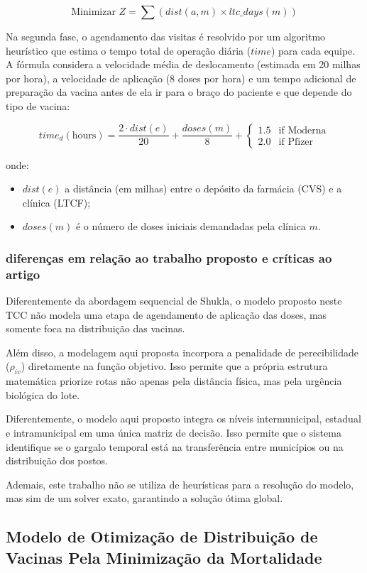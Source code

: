 \[
\text{Minimizar } Z = \sum (dist(a,m) \times ltc\_days(m))
\]

Na segunda fase, o agendamento das visitas é resolvido por um algoritmo heurístico que estima o tempo total de operação diária ($time$) para cada equipe. A fórmula considera a velocidade média de deslocamento (estimada em 20 milhas por hora), a velocidade de aplicação (8 doses por hora) e um tempo adicional de preparação da vacina antes de ela ir para o braço do paciente e que depende do tipo de vacina:

\[
time_{d}(\text{hours}) = \frac{2 \cdot dist(e)}{20} + \frac{doses(m)}{8} + 
\begin{cases} 
    1.5 & \text{if Moderna} \\
    2.0 & \text{if Pfizer} 
\end{cases}
\]

onde:
\begin{itemize}
    \item $dist(e)$ a distância (em milhas) entre o depósito da farmácia (CVS) e a clínica (LTCF);
    \item $doses(m)$ é o número de doses iniciais demandadas pela clínica $m$.
\end{itemize}

\subsubsection{diferenças em relação ao trabalho proposto e críticas ao artigo}

Diferentemente da abordagem sequencial de Shukla, o modelo proposto neste TCC não modela uma etapa de agendamento de aplicação das doses, mas somente foca na distribuição das vacinas. 

Além disso, a modelagem aqui proposta incorpora a penalidade de perecibilidade ($\rho_{iv}$) diretamente na função objetivo. Isso permite que a própria estrutura matemática priorize rotas não apenas pela distância física, mas pela urgência biológica do lote.

Diferentemente, o modelo aqui proposto integra os níveis intermunicipal, estadual e intramunicipal em uma única matriz de decisão. Isso permite que o sistema identifique se o gargalo temporal está na transferência entre municípios ou na distribuição dos postos.

Ademais, este trabalho não se utiliza de heurísticas para a resolução do modelo, mas sim de um solver exato, garantindo a solução ótima global.

\subsection{Modelo de Otimização de Distribuição de Vacinas Pela Minimização da Mortalidade}

